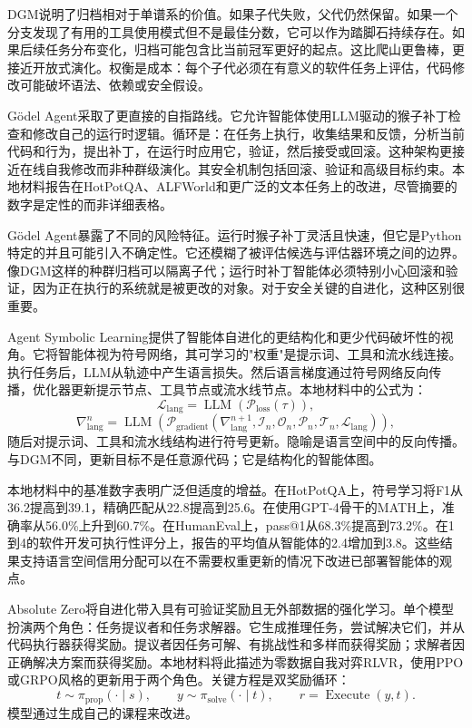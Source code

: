 DGM说明了归档相对于单谱系的价值。如果子代失败，父代仍然保留。如果一个分支发现了有用的工具使用模式但不是最佳分数，它可以作为踏脚石持续存在。如果后续任务分布变化，归档可能包含比当前冠军更好的起点。这比爬山更鲁棒，更接近开放式演化。权衡是成本：每个子代必须在有意义的软件任务上评估，代码修改可能破坏语法、依赖或安全假设。

G{\"o}del Agent采取了更直接的自指路线\cite{yin2024godel}。它允许智能体使用LLM驱动的猴子补丁检查和修改自己的运行时逻辑。循环是：在任务上执行，收集结果和反馈，分析当前代码和行为，提出补丁，在运行时应用它，验证，然后接受或回滚。这种架构更接近在线自我修改而非种群级演化。其安全机制包括回滚、验证和高级目标约束。本地材料报告在HotPotQA、ALFWorld和更广泛的文本任务上的改进，尽管摘要的数字是定性的而非详细表格。

G{\"o}del Agent暴露了不同的风险特征。运行时猴子补丁灵活且快速，但它是Python特定的并且可能引入不确定性。它还模糊了被评估候选与评估器环境之间的边界。像DGM这样的种群归档可以隔离子代；运行时补丁智能体必须特别小心回滚和验证，因为正在执行的系统就是被更改的对象。对于安全关键的自进化，这种区别很重要。

Agent Symbolic Learning提供了智能体自进化的更结构化和更少代码破坏性的视角\cite{agentsymboliclearning2024}。它将智能体视为符号网络，其可学习的"权重"是提示词、工具和流水线连接。执行任务后，LLM从轨迹中产生语言损失。然后语言梯度通过符号网络反向传播，优化器更新提示节点、工具节点或流水线节点。本地材料中的公式为：
\begin{equation}
  \mathcal{L}_{\mathrm{lang}} = \operatorname{LLM}(\mathcal{P}_{\mathrm{loss}}(\tau)),
\end{equation}
\begin{equation}
  \nabla^n_{\mathrm{lang}} = \operatorname{LLM}\left(\mathcal{P}_{\mathrm{gradient}}(\nabla^{n+1}_{\mathrm{lang}}, \mathcal{I}_n, \mathcal{O}_n, \mathcal{P}_n, \mathcal{T}_n, \mathcal{L}_{\mathrm{lang}})\right),
\end{equation}
随后对提示词、工具和流水线结构进行符号更新。隐喻是语言空间中的反向传播。与DGM不同，更新目标不是任意源代码；它是结构化的智能体图。

本地材料中的基准数字表明广泛但适度的增益。在HotPotQA上，符号学习将F1从36.2提高到39.1，精确匹配从22.8提高到25.6。在使用GPT-4骨干的MATH上，准确率从56.0\%上升到60.7\%。在HumanEval上，pass@1从68.3\%提高到73.2\%。在1到4的软件开发可执行性评分上，报告的平均值从智能体的2.4增加到3.8。这些结果支持语言空间信用分配可以在不需要权重更新的情况下改进已部署智能体的观点。

Absolute Zero将自进化带入具有可验证奖励且无外部数据的强化学习\cite{absolutezero2025}。单个模型扮演两个角色：任务提议者和任务求解器。它生成推理任务，尝试解决它们，并从代码执行器获得奖励。提议者因任务可解、有挑战性和多样而获得奖励；求解者因正确解决方案而获得奖励。本地材料将此描述为零数据自我对弈RLVR，使用PPO或GRPO风格的更新用于两个角色。关键方程是双奖励循环：
\begin{equation}
  t \sim \pi_{\mathrm{prop}}(\cdot\mid s),\qquad y\sim\pi_{\mathrm{solve}}(\cdot\mid t),\qquad r=\operatorname{Execute}(y,t).
\end{equation}
模型通过生成自己的课程来改进。

